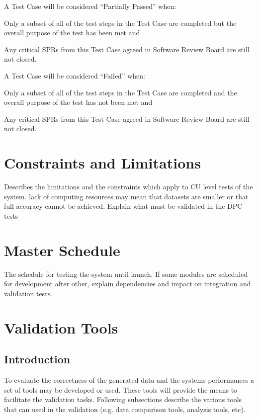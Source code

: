 A Test Case will be considered ``Partially Passed'' when:
\begin{itemize_single}
\item Only a subset of all of the test steps in the Test Case are completed but the overall purpose of the test has been met and
\item Any critical SPRs from this Test Case agreed in Software Review Board are still not closed.
\end{itemize_single}

A Test Case will be considered ``Failed'' when:
\begin{itemize_single}
\item Only a subset of all of the test steps in the Test Case are completed and the overall purpose of the test has not been met and
\item Any critical SPRs from this Test Case agreed in Software Review Board are still not closed.
\end{itemize_single}

\section{Constraints and Limitations}

Describes the limitations and the constraints which apply to CU level tests of the system. lack of computing resources may mean that datasets are smaller or that full accuracy cannot be achieved. Explain what must be validated in the DPC tests

\section{Master Schedule}

The schedule for testing the system until launch. If some modules are scheduled for development after other, explain dependencies and impact on integration and validation tests.

\section{Validation Tools}
\subsection{Introduction}

To evaluate the correctness of the generated data and the systems performances a set of tools may be developed or used. These
tools will provide the means to facilitate the validation tasks. 
Following subsections describe the various tools that can used in the \product validation (e.g. data comparison tools, analysis tools, etc).

